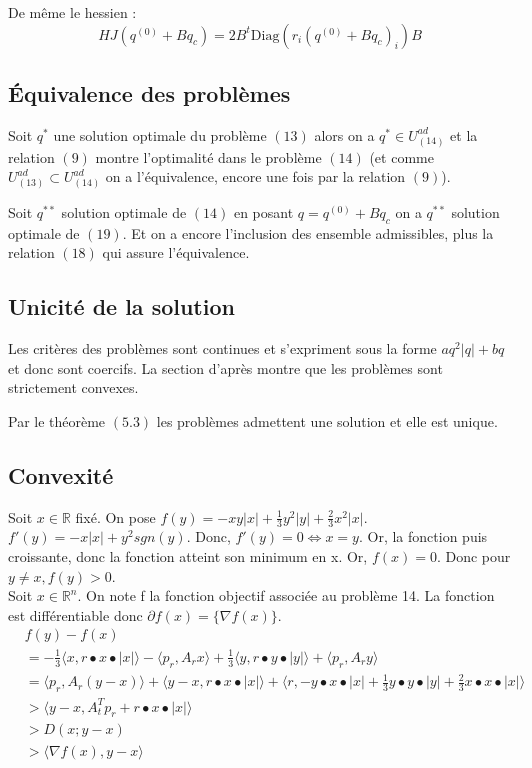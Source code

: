 \documentclass[12pt, letterpaper]{article}
\newcommand{\R}{\mathbb{R}^n}
\begin{document}
De même le hessien :
$$ H J (q^{(0)} + B q_c) = 2 B^t \text{Diag}(r_i (q^{(0)} + B q_c)_i) B $$

\subsection*{Équivalence des problèmes}

Soit $q^*$ une solution optimale du problème $(13)$ alors on a $q^* \in U^{ad}_{(14)}$ et la relation $(9)$ montre l'optimalité dans le problème $(14)$ (et comme $U_{(13)}^{ad} \subset U_{(14)}^{ad}$ on a l'équivalence, encore une fois par la relation $(9)$).

\noindent Soit $q^{**}$ solution optimale de $(14)$ en posant $q = q^{(0)} + B q_c$ on a $q^{**}$ solution optimale de $(19)$. Et on a encore l’inclusion des ensemble admissibles, plus la relation $(18)$ qui assure l'équivalence.

\subsection*{Unicité de la solution}

Les critères des problèmes sont continues et s'expriment sous la forme $a q^2|q| + b q$ et donc sont coercifs. La section d'après montre que les problèmes sont strictement convexes.

Par le théorème $(5.3)$ les problèmes admettent une solution et elle est unique.

\subsection*{Convexité}
Soit $x\in \mathbb{R}$ fixé. On pose $f(y) = -x y |x| + \frac{1}{3} y^2 |y| + \frac{2}{3} x^2 |x|$.
 $f'(y) = -x |x| + y^2 sgn(y)$. Donc, $f'(y) = 0 \Leftrightarrow x = y$. Or, la fonction puis croissante, donc la fonction atteint son minimum en x. Or, $f(x) = 0$. Donc pour $y \neq x, f(y) > 0
$. \\

Soit $x\in\R$. On note f la fonction objectif associée au problème 14. La fonction est différentiable donc $\partial f(x) = \{\nabla f(x)\}$. 
\begin{align*}
&f(y) - f(x) \\
&= -\frac{1}{3} \langle x,r \bullet x \bullet |x|\rangle  - \langle p_r,A_rx\rangle  + \frac{1}{3}\langle y,r \bullet y \bullet |y|\rangle  + \langle p_r,A_ry\rangle   \\
&= \langle p_r,A_r(y - x)\rangle  + \langle y-x, r \bullet x \bullet |x|\rangle  + \langle r, -y \bullet x \bullet |x| + \frac{1}{3}y \bullet y \bullet |y| + \frac{2}{3}x \bullet x \bullet |x|\rangle \\
&>  \langle y-x,A_t^Tp_r + r \bullet x \bullet |x|\rangle  \tag{les termes que l'on a enlevé étaient positifs par le lemme ci-dessus} \\
&>  D(x;y-x)\\
&>  \langle \nabla f(x),y-x\rangle 
\end{align*}
\end{document}
